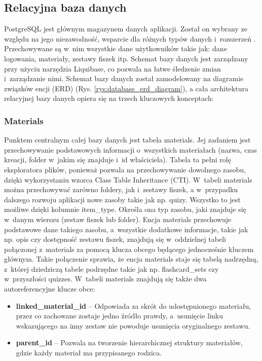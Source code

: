 \subsection*{Relacyjna baza danych}

PostgreSQL jest głównym magazynem danych aplikacji. Został on wybrany ze względu na jego niezawodność, 
wsparcie dla różnych typów danych i~rozszerzeń \cite{postgresql_docs}. Przechowywane są w~nim wszystkie dane użytkowników takie jak:
dane logowania, materiały, zestawy fiszek itp. Schemat bazy danych jest zarządzany przy użyciu narzędzia Liquibase, 
co pozwala na łatwe śledzenie zmian i~zarządzanie nimi.
Schemat bazy danych został zamodelowany na diagramie związków encji (ERD) (Rys. \ref{rys:database_erd_diagram}), 
a cała architektura relacyjnej bazy danych opiera się na trzech kluczowych konceptach:

\subsubsection*{Materials}
Punktem centralnym całej bazy danych jest tabela materials. Jej zadaniem jest przechowywanie podstawowych informacji o~wszystkich 
materiałach (nazwa, czas kreacji, folder w~jakim się znajduje i~id właściciela). Tabela ta
pełni rolę eksploratora plików, ponieważ pozwala na przechowywanie dowolnego zasobu, dzięki wykorzystaniu
wzorca Class Table Inheritance (CTI). W~tabeli materials można przechowywać zarówno foldery, jak i~zestawy fiszek, 
a w~przypadku dalszego rozwoju aplikacji nowe zasoby takie jak np. quizy. Wszystko to jest możliwe dzięki kolumnie 
item\_type. Określa ona typ zasobu, jaki znajduje się w~danym wierszu (zestaw fiszek lub folder). Encja materials 
przechowuje podstawowe dane takiego zasobu, a~wszystkie dodatkowe informacje, 
takie jak np. opis czy dostępność zestawu fiszek, znajdują się w~oddzielnej tabeli połączonej z~materials za pomocą klucza obcego
będącego jednocześnie kluczem głównym. Takie połączenie sprawia, że encja materials staje się tabelą nadrzędną, z~której dziedziczą 
tabele podrzędne takie jak np. flashcard\_sets czy w~przyszłości quizzes. W~tabeli materials znajdują się także dwa autoreferencyjne 
klucze obce:
\begin{itemize}
    \item \textbf{linked\_material\_id} -- Odpowiada za skrót do udostępnionego materiału, przez co zachowane zostaje jedno źródło prawdy, a~usunięcie linku
    wskazującego na inny zestaw nie powoduje usunięcia oryginalnego zestawu.
    \item \textbf{parent\_id} -- Pozwala na tworzenie hierarchicznej struktury materiałów, gdzie każdy materiał ma przypisanego rodzica.
\end{itemize}

